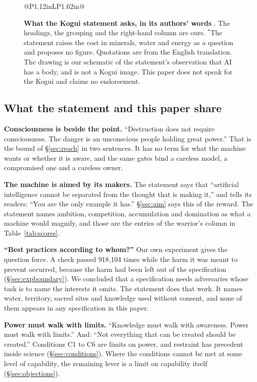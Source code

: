 \documentclass[10pt,twocolumn,letterpaper]{article}
\theoremstyle{definition}
\newcommand{\para}[1]{\smallskip\noindent\textbf{#1}\enspace}
\newcommand{\BndOmitChecks}{918{,}104}
\begin{document}
\begin{figure}[t]
\begin{tcolorbox}
\begin{minipage}[c]{0.685\linewidth}
\begin{tabularx}{\linewidth}{@{}P{1.12in}LP{1.62in}@{}}
\bottomrule
\end{tabularx}
\end{minipage}
\end{tcolorbox}
\caption{\textbf{What the Kogui statement asks, in its authors' words} \cite{kogui}. The headings, the grouping and the right-hand column are ours. $^{\ast}$The statement raises the cost in minerals, water and energy as a question and proposes no figure. Quotations are from the English translation. The drawing is our schematic of the statement's observation that AI has a body, and is not a Kogui image. This paper does not speak for the Kogui and claims no endorsement.}
\label{fig:kogui}
\end{figure}

\subsection{What the statement and this paper share}

\para{Consciousness is beside the point.} ``Destruction does not require consciousness. The danger is an unconscious people holding great power.'' That is the bound of \S\ref{sec:reach} in two sentences. It has no term for what the machine wants or whether it is aware, and the same gates bind a careless model, a compromised one and a careless owner.

\para{The machine is aimed by its makers.} The statement says that ``artificial intelligence cannot be separated from the thought that is making it,'' and tells its readers: ``You are the only example it has.'' \S\ref{sec:aim} says this of the reward. The statement names ambition, competition, accumulation and domination as what a machine would magnify, and those are the entries of the warrior's column in Table~\ref{tab:scores}.

\para{``Best practices according to whom?''} Our own experiment gives the question force. A check passed \BndOmitChecks{} times while the harm it was meant to prevent occurred, because the harm had been left out of the specification (\S\ref{sec:expboundary}). We concluded that a specification needs adversaries whose task is to name the interests it omits. The statement does that work. It names water, territory, sacred sites and knowledge used without consent, and none of them appears in any specification in this paper.

\para{Power must walk with limits.} ``Knowledge must walk with awareness. Power must walk with limits.'' And: ``Not everything that can be created should be created.'' Conditions C1 to C6 are limits on power, and restraint has precedent inside science (\S\ref{sec:conditions}). Where the conditions cannot be met at some level of capability, the remaining lever is a limit on capability itself (\S\ref{sec:objections}).
\end{document}

